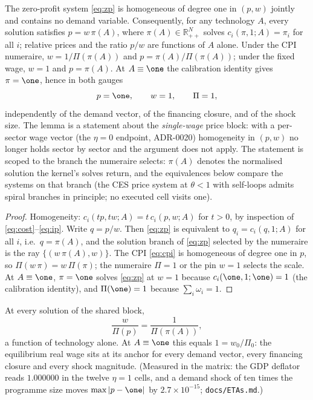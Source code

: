 \begin{lemma}\label{lem:price}
The zero-profit system \eqref{eq:zp} is homogeneous of degree one in
$(p,w)$ jointly and contains no demand variable. Consequently, for any
technology $A$, every solution satisfies $p = w\,\pi(A)$, where
$\pi(A) \in \mathbb{R}^N_{++}$ solves $c_i(\pi,1;A) = \pi_i$ for all $i$;
relative prices and the ratio $p/w$ are functions of $A$ alone. Under the
CPI numeraire, $w = 1/\Pi(\pi(A))$ and $p = \pi(A)/\Pi(\pi(A))$; under the
fixed wage, $w = 1$ and $p = \pi(A)$. At $A \equiv \one$ the calibration
identity gives $\pi = \one$, hence in both gauges
\begin{equation}
p = \one, \qquad w = 1, \qquad \Pi = 1,
\end{equation}
independently of the demand vector, of the financing closure, and of the
shock size. The lemma is a statement about the
\emph{single-wage} price block: with a per-sector wage vector (the
$\eta = 0$ endpoint, ADR-0020) homogeneity in $(p, w)$ no longer holds
sector by sector and the argument does not apply.
The statement is scoped to the branch the numeraire
selects: $\pi(A)$ denotes the normalised solution the kernel's solves return,
and the equivalences below compare the systems on that branch (the CES price
system at $\theta<1$ with self-loops admits spiral branches in principle; no
executed cell visits one).
\end{lemma}

\begin{proof}
Homogeneity: $c_i(tp, tw; A) = t\, c_i(p,w;A)$ for $t>0$, by inspection of
\eqref{eq:cost}--\eqref{eq:ip}. Write $q = p/w$. Then \eqref{eq:zp} is
equivalent to $q_i = c_i(q,1;A)$ for all $i$, i.e.\ $q = \pi(A)$, and
the solution branch of \eqref{eq:zp} selected by the
numeraire is the ray $\{(w\,\pi(A), w)\}$. The
CPI \eqref{eq:cpi} is homogeneous of degree one in $p$, so
$\Pi(w\,\pi) = w\,\Pi(\pi)$; the numeraire $\Pi = 1$ or the pin $w = 1$
selects the scale. At $A \equiv \one$, $\pi = \one$ solves
\eqref{eq:zp} at $w = 1$ because $c_i(\one,1;\one) = 1$ (the calibration
identity), and $\Pi(\one) = 1$ because $\sum_i \omega_i = 1$.
\end{proof}

\begin{corollary}\label{cor:realwage}
At every solution of the shared block,
\begin{equation}
\frac{w}{\Pi(p)} = \frac{1}{\Pi(\pi(A))},
\end{equation}
a function of technology alone. At $A \equiv \one$ this equals $1 =
w_0/\Pi_0$: the equilibrium real wage sits at its anchor for every demand
vector, every financing closure and every shock magnitude. (Measured in the
matrix: the GDP deflator reads $1.000000$ in the
twelve $\eta = 1$ cells, and a demand
shock of ten times the programme size moves $\max|p-\one|$ by
$2.7\times10^{-15}$; \texttt{docs/ETAs.md}.)
\end{corollary}

